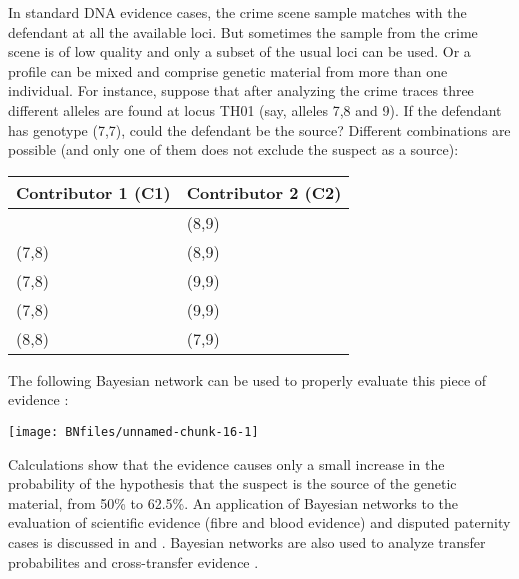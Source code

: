 \documentclass{article}
\begin{document}
In standard DNA evidence cases, the crime scene sample matches with the defendant at all the available loci. %
But sometimes the sample
from the crime scene is of low quality and only a subset of the usual
loci can be used. Or a profile can be mixed and comprise genetic material from more than one individual. For instance, suppose that after analyzing the crime traces three different alleles are found at locus TH01 (say, alleles 7,8 and 9). If the defendant has genotype (7,7), could the defendant be the source?
Different combinations are possible (and only one of them does not exclude the suspect as a source):

%
\begin{center}
\begin{tabular}{@{}ll@{}}
\toprule
Contributor 1 (C1) & Contributor 2  (C2)
\\ \midrule (7,7) & (8,9)\\
(7,8) & (8,9)\\
(7,8) & (9,9)\\
(7,8) & (9,9)\\
(8,8) & (7,9)\\ \bottomrule
\end{tabular}
\end{center}
%
The following Bayesian network can be
used to properly evaluate this piece of evidence \citep{weir1997interpreting, cowell2011ProbabilisticExpertSystems}:
%
\begin{center}\texttt{[image: BNfiles/unnamed-chunk-16-1]} \end{center}

\noindent
Calculations show that the evidence causes only a small increase in the probability of the hypothesis that the suspect is the source of the genetic material, from 50\% to 62.5\%.
%
An application of Bayesian networks to the evaluation of scientific evidence (fibre
and blood evidence) and disputed paternity cases is discussed in 
\citep{dawid1997using} and \citep{dawid1999inference}. 
Bayesian networks are also used to analyze 
 transfer probabilites  \citep{garbolino2002evaluation}  
and cross-transfer evidence 
\citep{aitken2003GraphicalModelEvaluation}.

\end{document}
